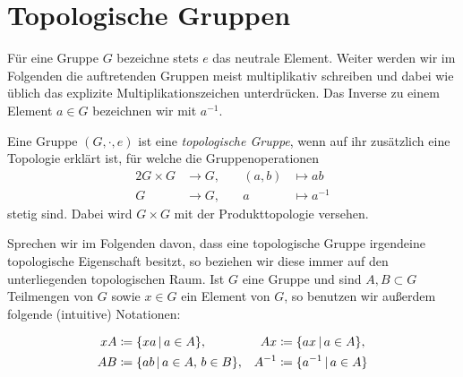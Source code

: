 \chapter{Topologische Gruppen}
Für eine Gruppe $G$ bezeichne stets $e$ das neutrale Element. Weiter werden wir
im Folgenden die auftretenden Gruppen meist multiplikativ schreiben und dabei
wie üblich das explizite Multiplikationszeichen unterdrücken. Das Inverse zu
einem Element $a\in G$ bezeichnen wir mit $a^{-1}$.

\begin{thDef}
    Eine Gruppe $(G,\cdot, e)$ ist eine \emph{topologische Gruppe}, wenn auf ihr
    zusätzlich eine Topologie erklärt ist, für welche die Gruppenoperationen
    \begin{alignat*}{2}
        G \times G &\to G,  &\quad (a,b) &\mapsto ab
        \\
        G &\to G,           &\quad     a &\mapsto a^{-1}
    \end{alignat*}
    stetig sind. Dabei wird $G\times G$ mit der Produkttopologie versehen.
\end{thDef}

Sprechen wir im Folgenden davon, dass eine topologische Gruppe irgendeine
topologische Eigenschaft besitzt, so beziehen wir diese immer auf den
unterliegenden topologischen Raum.
Ist $G$ eine Gruppe und sind $A,B\subset G$ Teilmengen von $G$ sowie $x\in G$
ein Element von $G$, so benutzen wir außerdem folgende (intuitive) Notationen:
\begin{thNotation} 
    \begin{align*}
        xA &\defeq \{ xa \Mid a\in A \},            &
        Ax &\defeq \{ ax \Mid a\in A \},            \\
        AB &\defeq \{ ab \Mid a\in A,\, b\in B \},  &
        A^{-1} &\defeq \{ a^{-1} \Mid a\in A \}     %
    \end{align*}
\end{thNotation}

